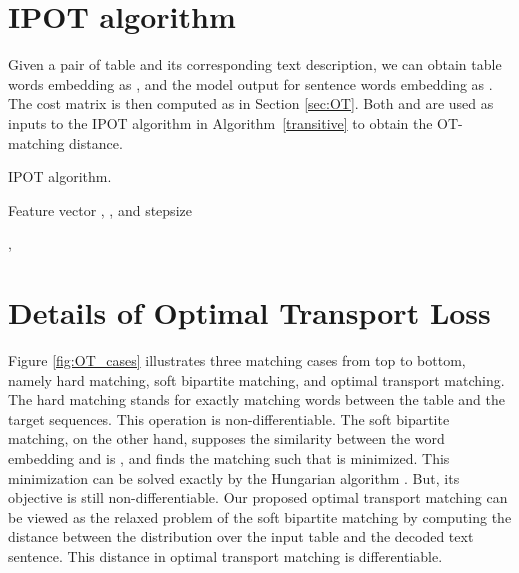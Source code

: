 \documentclass[11pt,a4paper]{article}
\begin{document}
\section{IPOT algorithm}\label{app:IPOT}

Given a pair of table and its corresponding text description, we can obtain table words embedding as , and the model output for 
sentence words embedding as . The cost matrix  is then computed as in Section \ref{sec:OT}. Both  and  are used as inputs to the IPOT algorithm in Algorithm~\ref{transitive} to obtain the OT-matching distance.


\begin{algorithm}[ht!]
	\caption{IPOT algorithm.}\label{transitive}
	\begin{algorithmic}
	\REQUIRE Feature vector , , and stepsize 
	
	\STATE  
	
	\STATE , 
	   \STATE 
	      \STATE 
	   \ENDFOR
	   \STATE 
	\ENDFOR

	\RETURN 


	
	\end{algorithmic}
\end{algorithm}




\section{Details of Optimal Transport Loss} \label{app:OTloss}
Figure \ref{fig:OT_cases} illustrates three matching cases from top to bottom, namely hard matching, soft bipartite matching, and optimal transport matching. The hard matching stands for exactly matching words between the table and the target sequences. This operation is non-differentiable. The soft bipartite matching, on the other hand, supposes the similarity between the word embedding  and  is , and finds the matching such that  is minimized. This minimization can be solved exactly by the Hungarian algorithm \cite{kuhn1955}. But, its objective is still non-differentiable. Our proposed optimal transport matching can be viewed as the relaxed problem of the soft bipartite matching by computing the distance between the distribution over the input table and the decoded text sentence. This distance in optimal transport matching is differentiable.
\end{document}
